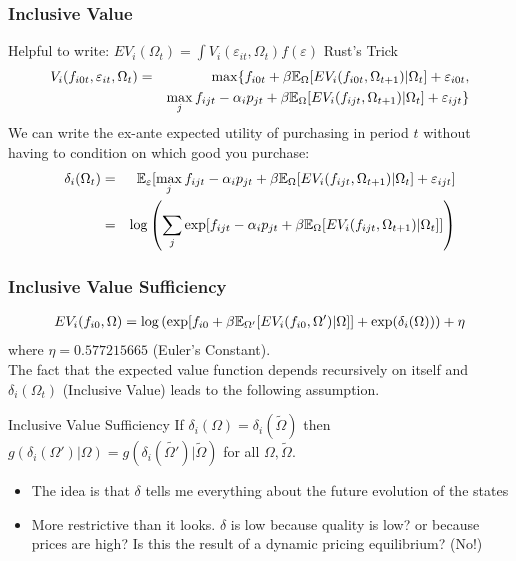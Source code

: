 \begin{frame}
\frametitle{Inclusive Value}
 Helpful to write: $EV_i(\Omega_t)= \int V_i(\varepsilon_{it},  \Omega_t)f(\varepsilon)$ \alert{Rust's Trick}
\begin{eqnarray*}
V_i(f_{i0t},\varepsilon_{i t}, \Omega_t) &=& \max \{ f_{i0t} + \beta \mathbb{E}_{\Omega}[ EV_i (f_{i0t}, \Omega_{t+1}) |\Omega_{t} ] + \varepsilon_{i0t},\\
&& \max_j f_{ijt}  -\alpha_i p_{jt} + \beta \mathbb{E}_{\Omega}[ E V_i (f_{ijt}, \Omega_{t+1}) |\Omega_{t}] + \varepsilon_{ijt}  \}
\end{eqnarray*}
We can write the \alert{ex-ante} expected utility of purchasing in period $t$ without having to condition on which good you purchase:
\begin{eqnarray*} 
\delta_{i}(\Omega_t) &=& \mathbb{E}_{\varepsilon} [ \max_j f_{ijt}  -\alpha_i p_{jt} + \beta \mathbb{E}_{\Omega}[ E V_i (f_{ijt}, \Omega_{t+1}) |\Omega_{t}] + \varepsilon_{ijt}]  \\
&=& \log \left( \sum_j \exp[ f_{ijt}  -\alpha_i p_{jt} + \beta \mathbb{E}_{\Omega}[ E V_i (f_{ijt}, \Omega_{t+1}) |\Omega_{t}] ]  \right)
\end{eqnarray*}
\end{frame}

\begin{frame}
\frametitle{Inclusive Value Sufficiency}
\begin{eqnarray*}
\small EV_i(f_{i0}, \Omega) = \log\left( \exp[ f_{i0} + \beta \mathbb{E}_{\Omega'}[ EV_i (f_{i0}, \Omega') |\Omega]] + \exp(\delta_i(\Omega))  \right) + \eta
\end{eqnarray*}
\footnotesize 
\alert{where $\eta = 0.577215665$ (Euler's Constant).}\\
\normalsize
The fact that the expected value function depends recursively on itself and $\delta_{i}(\Omega_t)$ (Inclusive Value) leads to the following assumption.
\begin{block}{Inclusive Value Sufficiency}
If $\delta_i(\Omega) = \delta_i(\tilde{\Omega})$ then $g(\delta_i(\Omega') | \Omega)= g(\delta_i(\tilde{\Omega'}) | \tilde{\Omega})$ for all $\Omega,\tilde{\Omega}$.
\end{block}
\begin{itemize}
\item The idea is that $\delta$ tells me everything about the future evolution of the states
\item More restrictive than it looks.  $\delta$ is low because quality is low? or because prices are high? Is this the result of a dynamic pricing equilibrium? (No!)
\end{itemize}
\end{frame}

